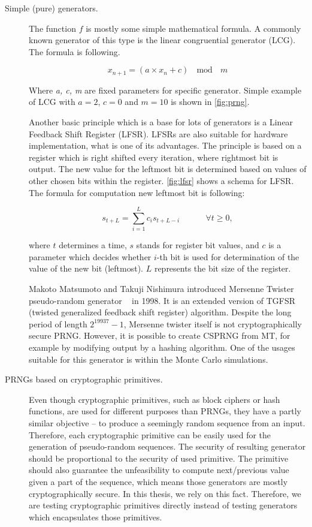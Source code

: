 \documentclass[
    digital,    %
    oneside,    %
    color,
    11pt,
    nocover,
    notable,
    nolof,
    nolot,
    final
]{fithesis3}
\renewcommand\_{\textunderscore\allowbreak}
\begin{document}
\begin{description}
	\item[Simple (pure) generators.] The function $f$ is mostly some simple mathematical formula. A commonly known generator of this type is the linear congruential generator (LCG). The formula is following. \cite{LEcuyer07testu01}
	
	\begin{equation}
	x_{n+1} = \left( a \times x_n + c \right)~~\bmod~~m
	\label{formula:lcg}
	\end{equation}	
	
	Where \textit{a, c, m} are fixed parameters for specific generator. Simple example of LCG with $a = 2$, $c = 0$ and $m = 10$ is shown in \cref{fig:prng}.

Another basic principle which is a base for lots of generators is a Linear Feedback Shift Register (LFSR). LFSRs are also suitable for hardware implementation, what is one of its advantages. The principle is based on a register which is right shifted every iteration, where rightmost bit is output. The new value for the leftmost bit is determined based on values of other chosen bits within the register. \cref{fig:lfsr} shows a schema for LFSR. The formula for computation new leftmost bit is following:

\begin{equation}
s_{t + L} = \sum_{i = 1}^{L} c_{i}s_{t + L - i}~~~~~~~~~~~~~~\forall t \geq 0, 
\end{equation}

where $t$ determines a time, $s$ stands for register bit values, and $c$ is a parameter which decides whether $i$-th bit is used for determination of the value of the new bit (leftmost). $L$ represents the bit size of the register. \cite{Canteaut2005}

Makoto Matsumoto and Takuji Nishimura introduced Mersenne Twister pseudo-random generator ~\cite{Matsumoto:1998:MTE:272991.272995} in 1998. It is an extended version of TGFSR~\cite{matsumoto1992twisted} (twisted generalized feedback shift register) algorithm. Despite the long period of length $2^{19937} - 1$, Mersenne twister itself is not cryptographically secure PRNG. However, it is possible to create CSPRNG from MT, for example by modifying output by a hashing algorithm. One of the usages suitable for this generator is within the Monte Carlo simulations. 

\item[PRNGs based on cryptographic primitives.] Even though cryptographic primitives, such as block ciphers or hash functions, are used for different purposes than PRNGs, they have a partly similar objective -- to produce a seemingly random sequence from an input. Therefore, each cryptographic primitive can be easily used for the generation of pseudo-random sequences. The security of resulting generator should be proportional to the security of used primitive. The primitive should also guarantee the unfeasibility to compute next/previous value given a part of the sequence, which means those generators are mostly cryptographically secure. In this thesis, we rely on this fact. Therefore, we are testing cryptographic primitives directly instead of testing generators which encapsulates those primitives.


\end{description}
\end{document}
